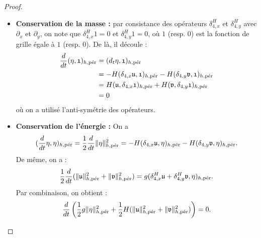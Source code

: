 \begin{proof}
\begin{itemize}
\item \textbf{Conservation de la masse :}
par consistance des opérateurs $\delta_{4,x}^H$ et $\delta_{4,y}^H$ avec $\partial_x$ et $\partial_y$, on note que $\delta_{4,x}^H \mathfrak{1} = \mathfrak{0}$ et $\delta_{4,y}^H \mathfrak{1} = \mathfrak{0}$, où $\mathfrak{1}$ (resp. $\mathfrak{0}$) est la fonction de grille égale à $1$ (resp. $0$). De là, il découle :
\begin{align*}
\dfrac{d}{dt} (\etafrak, \mathfrak{1})_{h,\per} & = ( d_t \etafrak, \mathfrak{1} )_{h,\per} \\
	& = - H (\delta_{4,x} \mathfrak{u}, \mathfrak{1})_{h,\per} - H (\delta_{4,y} \mathfrak{v}, \mathfrak{1})_{h,\per} \\
	& = H (\mathfrak{u}, \delta_{4,x} \mathfrak{1})_{h,\per} + H (\mathfrak{v}, \delta_{4,y} \mathfrak{1})_{h,\per} \\
	& = 0
\end{align*}
où on a utilisé l'anti-symétrie des opérateurs.

\item \textbf{Conservation de l'énergie :}
On a
\begin{equation}
(\dfrac{d}{dt}\etafrak, \etafrak)_{h,\per} = \dfrac{1}{2} \dfrac{d}{dt} \| \etafrak \|^2_{h,\per} = - H (\delta_{4,x} \mathfrak{u}, \etafrak)_{h,\per} - H (\delta_{4,y} \mathfrak{v}, \etafrak)_{h,\per}.
\end{equation}
De même, on a :
\begin{equation}
\dfrac{1}{2} \dfrac{d}{dt} (\| \mathfrak{u} \|_{h,\per}^2 + \| \mathfrak{v} \|_{h,\per}^2) = g (\delta_{4,x}^H \mathfrak{u}+\delta_{4,y}^H \mathfrak{v}, \etafrak)_{h,\per}.
\end{equation}
Par combinaison, on obtient :
\begin{equation}
\dfrac{d}{dt} \left( \dfrac{1}{2} g \| \etafrak \|_{h,\per}^2 + \dfrac{1}{2} H ( \| \mathfrak{u} \|_{h,\per}^2 +  \| \mathfrak{v} \|_{h,\per}^2) \right) = 0.
\end{equation}
\end{itemize}
\end{proof}

